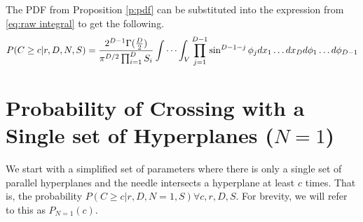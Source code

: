 \documentclass{article}
\begin{document}
The PDF from Proposition \ref{p:pdf} can be substituted into the expression from \ref{eq:raw integral}
to get the following.
\begin{align} 
	P(C\ge c|r, D, N, S)=\frac{2^{D-1}\Gamma(\frac{D}{2})}{\pi^{D/2}\prod_{i=1}^DS_i} \idotsint_V \prod_{j=1}^{D-1}\sin^{D-1-j}\phi_j dx_1\hdots dx_D d\phi_1 \hdots d\phi_{D-1} \label{eq:volume integral}
\end{align}


\section{Probability of Crossing with a Single set of Hyperplanes ($N=1$)} \label{s:n=1}
We start with a simplified set of parameters where there is only a single set of parallel hyperplanes and the needle intersects a
hyperplane at least $c$ times. That is, the probability $P(C\ge c | r, D, N=1, S) \forall c, r, D, S$. For brevity, we will refer to this
as $P_{N=1}(c)$. 
\end{document}
